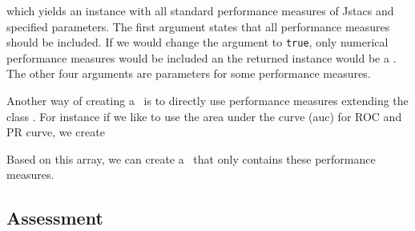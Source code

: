 which yields an instance with all standard performance measures of Jstacs and specified parameters. The first argument states that all performance measures should be included. If we would change the argument to \lstinline+true+, only numerical performance measures would be included an the returned instance would be a \NumericalPerformanceMeasureParameterSet. The other four arguments are parameters for some performance measures.

Another way of creating a \PerformanceMeasureParameterSet~is to directly use performance measures extending the class \AbstractPerformanceMeasure. For instance if we like to use the area under the curve (auc) for ROC and PR curve, we create 

\addtocounter{off}{1}

Based on this array, we can create a \PerformanceMeasureParameterSet~that only contains these performance measures.

\addtocounter{off}{1}

\subsection{Assessment}\label{Assessment}

\addtocounter{off}{6}
